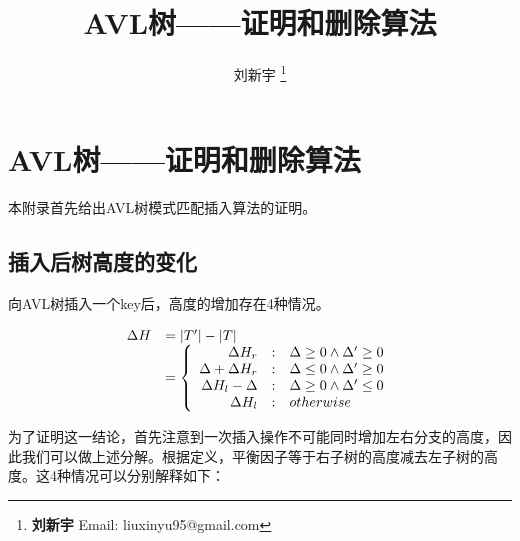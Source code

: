 \documentclass[UTF8]{article}
\begin{document}


\title{AVL树——证明和删除算法}

\author{刘新宇
\thanks{{\bfseries 刘新宇} \newline
  Email: liuxinyu95@gmail.com \newline}
  }

\maketitle
\fi


\ifx\wholebook\relax
\chapter{AVL树——证明和删除算法}
\fi


本附录首先给出AVL树模式匹配插入算法的证明。

\section{插入后树高度的变化}

向AVL树插入一个key后，高度的增加存在4种情况。

\[
\begin{array}{rl}
  \Delta H & = |T'| - |T| \\
              & = \left \{
                  \begin{array}{r@{\quad:\quad}l}
                  \Delta H_r & \Delta \geq 0 \land \Delta' \geq 0 \\
                  \Delta + \Delta H_r & \Delta \leq 0 \land \Delta' \geq 0 \\
                  \Delta H_l - \Delta & \Delta \geq 0 \land \Delta' \leq 0 \\
                  \Delta H_l & otherwise
                  \end{array} \right .
\end{array}
\]

为了证明这一结论，首先注意到一次插入操作不可能同时增加左右分支的高度，因此我们可以做上述分解。根据定义，平衡因子等于右子树的高度减去左子树的高度。这4种情况可以分别解释如下：
\end{document}
